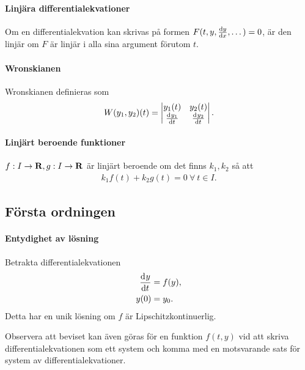 \paragraph{Linjära differentialekvationer}
Om en differentialekvation kan skrivas på formen $F(t, y, \dv{y}{x}, \dots) = 0$, är den linjär om $F$ är linjär i alla sina argument förutom $t$.

\paragraph{Wronskianen}
Wronskianen definieras som
\begin{align*}
	W(y_1, y_2)(t) = \mdet{y_{1}(t) & y_{2}(t) \\ \deval{y_{1}}{t}{t} & \deval{y_{2}}{t}{t}}.
\end{align*}

\paragraph{Linjärt beroende funktioner}
$f: I\to\mathbf{R}, g: I\to\mathbf{R}$ är linjärt beroende om det finns $k_{1}, k_{2}$ så att
\begin{align*}
	k_{1}f(t) + k_{2}g(t) = 0\ \forall\ t\in I.
\end{align*}

\subsection{Första ordningen}

\paragraph{Entydighet av lösning}
Betrakta differentialekvationen
\begin{align*}
	\dv[]{y}{t} (t) &= f(y), \\
	y(0)            &= y_0.
\end{align*}
Detta har en unik lösning om $f$ är Lipschitzkontinuerlig.

Observera att beviset kan även göras för en funktion $f(t, y)$ vid att skriva differentialekvationen som ett system och komma med en motsvarande sats för system av differentialekvationer.

